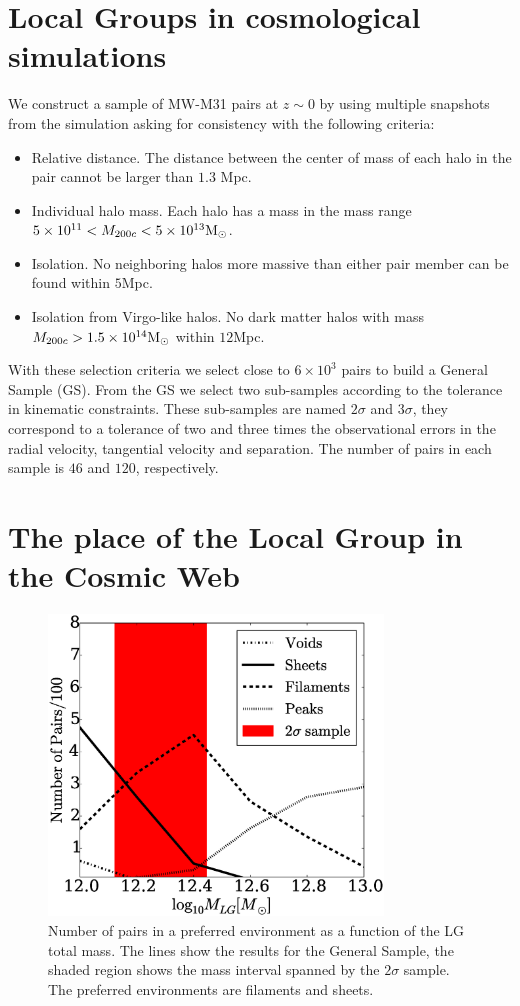 \documentclass{iau}
\newcommand{\Msun}{{\ifmmode{{\rm {M_{\odot}}}}\else{${\rm{M_{\odot}}}$}\fi}}
\begin{document}
\section{Local Groups in cosmological simulations}
We construct a sample of MW-M31 pairs at $z\sim 0$ by using multiple
snapshots from the simulation asking for consistency with the
following criteria:

\begin{itemize}
\item Relative distance. The distance between the center of mass of
  each halo in the pair cannot be larger than $1.3$ Mpc.
\item Individual halo mass. Each halo has a mass in the mass range
  $5\times 10^{11}<M_{200c}<5\times 10^{13}\Msun$.  
\item  Isolation. No neighboring halos more massive than either pair
member can be found within $5$Mpc.
\item Isolation from Virgo-like halos. No dark matter halos with mass
  $M_{200c}>1.5\times 10^{14}\Msun$ within $12$Mpc.
\end{itemize}

With these selection criteria we select close to $6\times 10^3$ pairs to build
a General Sample (GS). From the GS we select two sub-samples
according to the tolerance in kinematic constraints. These sub-samples 
are named $2\sigma$ and $3\sigma$, they correspond to a tolerance of
two and three times the observational errors in the radial velocity,
tangential velocity and separation. The number of pairs in each sample
is $46$ and $120$, respectively.  

\section{The place of the Local Group in the Cosmic Web}

\begin{figure}[t]
\begin{center}
 \includegraphics[width=3.5in]{histogram_mass_distro.eps} 
 \caption{Number of pairs in a preferred environment as a function of
   the LG total mass. The lines show the results for the General
   Sample, the shaded region shows the mass interval spanned by the
   $2\sigma$  sample. The preferred environments are
   filaments and sheets.}
   \label{fig:environment}
\end{center}
\end{figure}
\end{document}
